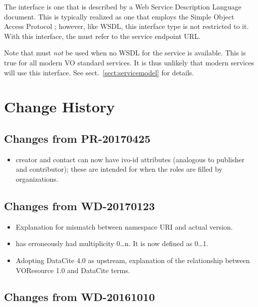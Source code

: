 \documentclass[11pt,a4paper]{ivoa}
\begin{document}

The  interface is one that is described by a Web
Service Description Language \citep{booth07} document. This is typically
realized as one that employs the Simple Object Access Protocol
\citep{std:SOAP}; however, like WSDL, this interface type is not
restricted to it. With this interface, the  must
refer to the service endpoint URL.

Note that  must \emph{not} be used when no WSDL for
the service is available.  This is true for all modern VO standard
services.  It is thus unlikely that modern services will use this
interface.  See sect.~\ref{sect:servicemodel} for details.

\appendix

\section{Change History}

\subsection{Changes from PR-20170425}

\begin{itemize} 
\item creator and contact can now have ivo-id attributes (analogous
to publisher and contributor); these are intended for when the roles are
filled by organizations.
\end{itemize}

\subsection{Changes from WD-20170123}

\begin{itemize}
\item Explanation for mismatch between namespace URI and actual version.
\item {} has erroneously had multiplicity 0\dots n.
It is now defined as 0\dots 1.
\item Adopting DataCite 4.0 as upstream, explanation of the relationship
between VOResource 1.0 and DataCite terms.
\end{itemize}

\subsection{Changes from WD-20161010}
\end{document}
